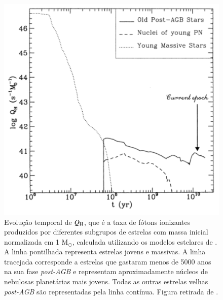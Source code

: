 \begin{figure}
	\centering
	\includegraphics[scale=0.6]{figuras/Binette1994Fig1.pdf}
	\caption[Evolução temporal de $Q_{\rm H}$]
	{Evolução temporal de $Q_{\rm H}$, que é a taxa de fótons ionizantes produzidos por diferentes subgrupos de estrelas com massa inicial normalizada em 1 M${}_{\odot}$, calculada utilizando os modelos estelares de \citet{BC93}. A linha pontilhada representa estrelas jovens e massivas. A linha tracejada corresponde a estrelas que gastaram menos de 5000 anos na sua fase {\em post-AGB} e representam aproximadamente núcleos de nebulosas planetárias mais jovens. Todas as outras estrelas velhas {\em post-AGB} são representadas pela linha contínua. Figura retirada de \citet{Binette.etal.1994a}.}
	\label{fig:Fig1Binette94}
\end{figure}

